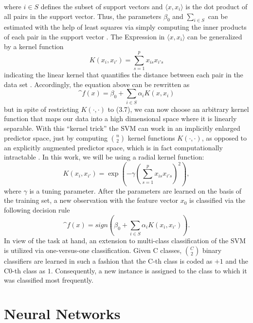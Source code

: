 where $i \in S$ defines the subset of support vectors and $\langle x, x_i \rangle$ is the dot product of all pairs in the support vector. Thus, the parameters $\beta_0$ and $\sum_{i \in S}$ can be estimated with the help of least squares via simply computing the inner products of each pair in the support vector \cite{efron_hastie_2016}. The Expression in $\langle x, x_i \rangle$ can be generalized by a kernel function
\begin{equation}
  K(x_i,x_{i'}) = \sum_{s=1}^{p} x_{is} x_{i's}
\end{equation}
indicating the linear kernel that quantifies the distance between each pair in the data set \cite{James:2014:ISL:2517747}. Accordingly, the equation above can be rewritten as
\begin{equation}
  \^{f}(x) = \beta_0 + \sum_{i \in S} \alpha_i K(x, x_i)
\end{equation}
but in spite of restricting $K(\cdot, \cdot)$ to (3.7), we can now choose an arbitrary kernel function that maps our data into a high dimensional space where it is linearly separable. With this ``kernel trick'' the SVM can work in an implicitly enlarged predictor space, just by computing $\binom{n}{2}$  kernel functions $K(\cdot, \cdot)$, as opposed to an explicitly augmented predictor space, which is in fact computationally intractable \cite{James:2014:ISL:2517747}. In this work, we will be using a radial kernel function:
\begin{equation}
  K(x_i,x_{i'}) = \exp(-\gamma(\sum_{s=1}^{p}x_{is}x_{i's})^2),
\end{equation}
where $\gamma$ is a tuning parameter. After the parameters are learned on the basis of the training set, a new observation with the feature vector $x_0$ is classified via the following decision rule
\begin{equation}
  \^{f}(x) = sign(\beta_0 + \sum_{i \in S} \alpha_i K(x_i, x_{i'})).
\end{equation}
In view of the task at hand, an extension to multi-class classification of the SVM is utilized via one-versus-one classification. Given C classes, $\binom{C}{2}$ binary classifiers are learned in such a fashion that the C-th class is coded as $+1$ and the C0-th class as $1$. Consequently, a new instance is assigned to the class to which it was classified most frequently.
\newpage
\section{Neural Networks}

